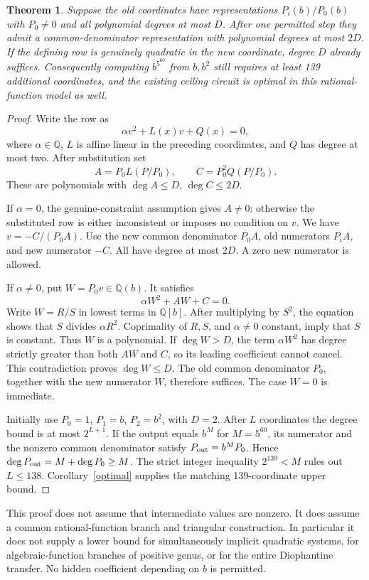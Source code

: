 \documentclass[11pt]{article}
\newtheorem{theorem}{Theorem}
\newcommand{\Q}{\mathbb Q}\newcommand{\Z}{\mathbb Z}
\begin{document}
\begin{theorem}\label{rational}
Suppose the old coordinates have representations $P_i(b)/P_0(b)$
with $P_0\ne0$ and all polynomial degrees at most $D$. After one
permitted step they admit a common-denominator representation with
polynomial degrees at most $2D$. If the defining row is genuinely
quadratic in the new coordinate, degree $D$ already suffices.
Consequently computing $b^{5^{60}}$ from $b,b^2$ still requires at
least 139 additional coordinates, and the existing ceiling circuit is
optimal in this rational-function model as well.
\end{theorem}
\begin{proof}
Write the row as
\[
                 \alpha v^2+L(x)v+Q(x)=0,
\]
where $\alpha\in\Q$, $L$ is affine linear in the preceding
coordinates, and $Q$ has degree at most two. After substitution set
\[
 A=P_0L(P/P_0),\qquad C=P_0^2Q(P/P_0).
\]
These are polynomials with $\deg A\le D$, $\deg C\le2D$.

If $\alpha=0$, the genuine-constraint assumption gives $A\ne0$:
otherwise the substituted row is either inconsistent or imposes no
condition on $v$. We have $v=-C/(P_0A)$. Use the new common
denominator $P_0A$, old numerators $P_iA$, and new numerator $-C$.
All have degree at most $2D$. A zero new numerator is allowed.

If $\alpha\ne0$, put $W=P_0v\in\Q(b)$. It satisfies
\[
                         \alpha W^2+AW+C=0.
\]
Write $W=R/S$ in lowest terms in $\Q[b]$. After multiplying by
$S^2$, the equation shows that $S$ divides $\alpha R^2$.
Coprimality of $R,S$, and $\alpha\ne0$ constant, imply that $S$
is constant. Thus $W$ is a polynomial. If $\deg W>D$, the term
$\alpha W^2$ has degree strictly greater than both $AW$ and $C$,
so its leading coefficient cannot cancel. This contradiction proves
$\deg W\le D$. The old common denominator $P_0$, together with
the new numerator $W$, therefore suffices. The case $W=0$ is immediate.

Initially use $P_0=1$, $P_1=b$, $P_2=b^2$, with $D=2$.
After $L$ coordinates the degree bound is at most $2^{L+1}$.
If the output equals $b^M$ for $M=5^{60}$, its numerator and the
nonzero common denominator satisfy $P_{\rm out}=b^MP_0$.
Hence $\deg P_{\rm out}=M+\deg P_0\ge M$. The strict integer
inequality $2^{139}<M$ rules out $L\le138$. Corollary~\ref{optimal}
supplies the matching 139-coordinate upper bound.
\end{proof}

This proof does not assume that intermediate values are nonzero.
It does assume a common rational-function branch and triangular
construction. In particular it does not supply a lower bound for
simultaneously implicit quadratic systems, for algebraic-function
branches of positive genus, or for the entire Diophantine transfer.
No hidden coefficient depending on $b$ is permitted.
\end{document}
